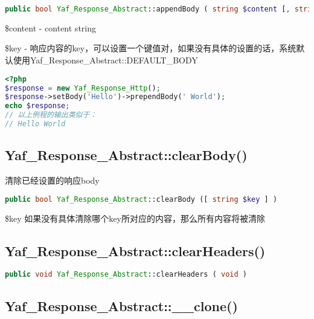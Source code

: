\begin{lstlisting}[language=PHP]
public bool Yaf_Response_Abstract::appendBody ( string $content [, string $key ] )
\end{lstlisting}

\begin{compactitem}
\item \$content - content string
\item \$key - 响应内容的key，可以设置一个键值对，如果没有具体的设置的话，系统默认使用Yaf\_Response\_Abstract::DEFAULT\_BODY
\end{compactitem}

\begin{lstlisting}[language=PHP]
<?php
$response = new Yaf_Response_Http();
$response->setBody('Hello')->prependBody(' World');
echo $response;
// 以上例程的输出类似于：
// Hello World
\end{lstlisting}



\subsection{Yaf\_Response\_Abstract::clearBody()}

清除已经设置的响应body

\begin{lstlisting}[language=PHP]
public bool Yaf_Response_Abstract::clearBody ([ string $key ] )
\end{lstlisting}

\begin{compactitem}
\item \$key 如果没有具体清除哪个key所对应的内容，那么所有内容将被清除
\end{compactitem}



\subsection{Yaf\_Response\_Abstract::clearHeaders()}



\begin{lstlisting}[language=PHP]
public void Yaf_Response_Abstract::clearHeaders ( void )
\end{lstlisting}



\subsection{Yaf\_Response\_Abstract::\_\_clone()}


